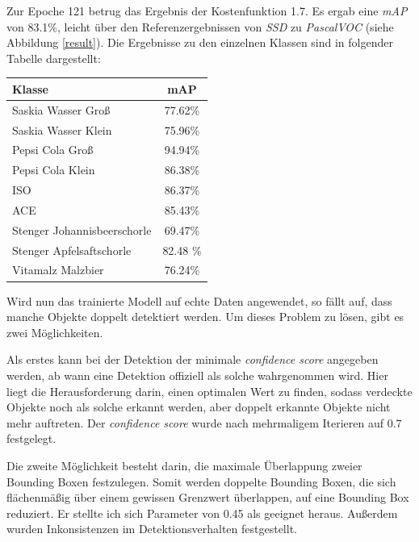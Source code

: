 Zur Epoche 121 betrug das Ergebnis der Kostenfunktion 1.7. Es ergab eine \textit{mAP} von 83.1\%, leicht über den Referenzergebnissen von \textit{SSD} zu \textit{PascalVOC} (siehe Abbildung \ref{result}). Die Ergebnisse zu den einzelnen Klassen sind in folgender Tabelle dargestellt:

\begin{center}
	\begin{tabular}[H]{l|c}
		Klasse & mAP \\
		\hline
		Saskia Wasser Groß & 77.62\% \\
		Saskia Wasser Klein & 75.96\% \\
		Pepsi Cola Groß & 94.94\% \\
		Pepsi Cola Klein & 86.38\% \\
		ISO & 86.37\% \\
		ACE & 85.43\% \\
		Stenger Johannisbeerschorle & 69.47\% \\
		Stenger Apfelsaftschorle & 82.48 \% \\
		Vitamalz Malzbier & 76.24\%
	\end{tabular}
	\label{table:ssdresults}
\end{center}

Wird nun das trainierte Modell auf echte Daten angewendet, so fällt auf, dass manche Objekte doppelt detektiert werden. Um dieses Problem zu lösen, gibt es zwei Möglichkeiten. 

Als erstes kann bei der Detektion der minimale \textit{confidence score} angegeben werden, ab wann eine Detektion offiziell als solche wahrgenommen wird. Hier liegt die Herausforderung darin, einen optimalen Wert zu finden, sodass verdeckte Objekte noch als solche erkannt werden, aber doppelt erkannte Objekte nicht mehr auftreten. Der \textit{confidence score} wurde nach mehrmaligem Iterieren auf 0.7 festgelegt.

Die zweite Möglichkeit besteht darin, die maximale Überlappung zweier Bounding Boxen festzulegen. Somit werden doppelte Bounding Boxen, die sich flächenmäßig über einem gewissen Grenzwert überlappen, auf eine Bounding Box reduziert. Er stellte ich sich Parameter von 0.45 als geeignet heraus. Außerdem wurden Inkonsistenzen im Detektionsverhalten festgestellt.

